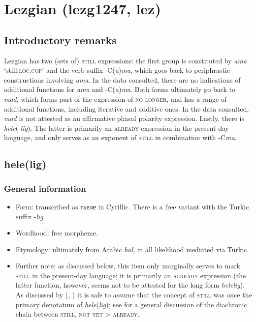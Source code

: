 \section{Lezgian (lezg1247, lez)}\label{appendixLezgian}
\subsection{Introductory remarks}
Lezgian has two (sets of) \textsc{still} expressions: the first group is constituted by \textit{ama} \lq still:\textsc{loc}.\textsc{cop}' and the verb suffix \mbox{-C(\textit{a})\textit{ma}}, which goes back to periphrastic constructions involving \textit{ama}. In the data consulted, there are no indications of additional functions for \textit{ama} and \mbox{-C(\textit{a})\textit{ma}}. Both forms ultimately go back to \textit{mad}, which forms part of the expression of \textsc{no longer}, and has a range of additional functions, including iterative and additive ones. In the data consulted, \textit{mad} is not attested as an affirmative phasal polarity expression. Lastly, there is \textit{hele}(-\textit{lig}). The latter is primarily an \textsc{already} expression in the present-day language, and only serves as an exponent of \textsc{still} in combination with \mbox{-C\textit{ma}}.

\subsection{hele(lig)}
\label{appendixLezgianHele}

\subsubsection{General information}
\begin{itemize}
	\item Form: transcribed as гьеле in Cyrillic. There is a free variant with the Turkic suffix \mbox{-\textit{lig}}. 
	\item Wordhood: free morpheme.
	\item Etymology: ultimately from Arabic \textit{hāl}, in all likelihood mediated via Turkic.
	\item Further note: as discussed below, this item only marginally serves to mark \textsc{still} in the present-day language; it is primarily an \textsc{already} expression (the latter function, however, seems not to be attested for the long form \textit{helelig}). As discussed by \citeauthor{vanderAuwera1993} (\citeyear{vanderAuwera1993},  \citeyear{vanderAuwera1998}) it is safe to assume that the concept of \textsc{still} was once the primary denotatum of \textit{hele}(\textit{lig}); see  for a general discussion of the diachronic chain between \textsc{still}, \textsc{not yet} > \textsc{already}.
\end{itemize}



